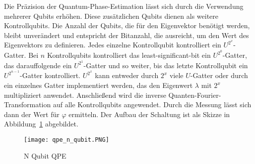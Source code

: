 Die Präzision der Quantum-Phase-Estimation lässt sich durch die Verwendung mehrerer Qubits erhöhen.
Diese zusätzlichen Qubits dienen als weitere Kontrollqubits.
Die Anzahl der Qubits, die für den Eigenvektor benötigt werden, 
bleibt unverändert und entspricht der Bitanzahl, 
die ausreicht, um den Wert des Eigenvektors zu definieren.
Jedes einzelne Kontrollqubit kontrolliert ein \(U^{2^x}\)-Gatter.
Bei \(n\) Kontrollqubits kontrolliert das least-significant-bit ein \(U^{2^0}\)-Gatter,
das darauffolgende ein \(U^{2^1}\)-Gatter und so weiter,
bis das letzte Kontrollqubit ein \(U^{2^{n-1}}\)-Gatter kontrolliert.
\(U^{2^x}\) kann entweder durch \(2^x\) viele \(U\)-Gatter oder durch ein einzelnes Gatter implementiert werden, 
das den Eigenwert \(\lambda\) mit \(2^x\) multipliziert anwendet.
Anschließend wird die inverse Quanten-Fourier-Transformation auf alle Kontrollqubits angewendet.
Durch die Messung lässt sich dann der Wert für \(\varphi\) ermitteln.
Der Aufbau der Schaltung ist als Skizze in Abbildung~\ref{fig:qpe_n_qubit} abgebildet.

\begin{figure}[H]
  \centering
  \texttt{[image: qpe\_n\_qubit.PNG]}
  \caption{N Qubit QPE}
  \label{fig:qpe_n_qubit}
\end{figure}

